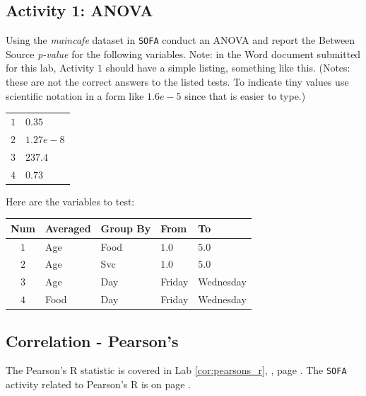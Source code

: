 \subsection{Activity 1: ANOVA} \label{para:act01}

Using the \textit{maincafe} dataset in \texttt{SOFA} conduct an ANOVA and report the Between Source \textit{p-value} for the following variables. Note: in the Word document submitted for this lab, Activity $ 1 $ should have a simple listing, something like this. (Notes: these are not the correct answers to the listed tests. To indicate tiny values use scientific notation in a form like $ 1.6e-5 $ since that is easier to type.)

\begin{center}
  \begin{tabular}{ll}
    $ 1 $ & $ 0.35 $ \\ 
    $ 2 $ & $ 1.27e-8 $ \\ 
    $ 3 $ & $ 237.4 $ \\ 
    $ 4 $ & $ 0.73 $ \\ 
  \end{tabular} 
\end{center}

Here are the variables to test:

\begin{center}
  \begin{tabular}{cllll}
    \hline 
    \textbf{Num} & \textbf{Averaged} & \textbf{Group By} & \textbf{From} & \textbf{To} \\ 
    \hline 
    $ 1 $ & Age & Food & $ 1.0 $ & $ 5.0 $ \\ 
    $ 2 $ & Age & Svc & $ 1.0 $ & $ 5.0 $ \\ 
    $ 3 $ & Age & Day & Friday & Wednesday \\ 
    $ 4 $ & Food & Day & Friday & Wednesday \\ 
    \hline 
  \end{tabular} 
\end{center}

\subsection{Correlation - Pearson's}

The Pearson's R statistic is covered in Lab \ref{cor:pearsons_r}, , page \pageref{cor:pearsons_r}. The \texttt{SOFA} activity related to Pearson's R is on page \pageref{cor:pearsons_r_proc}.

